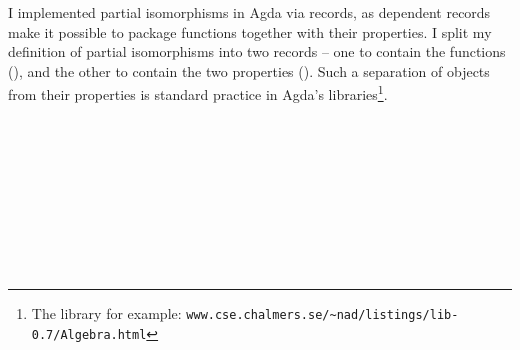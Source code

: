 \documentclass[12pt,a4paper,twoside,openright]{report}
\newcommand{\F}{\AgdaFunction}
\begin{document}
I implemented partial isomorphisms in Agda via records, as dependent records make it possible to package functions together with their properties. I split my definition of partial isomorphisms into two records -- one to contain the functions (\F{Iso}), and the other to contain the two properties (\F{IsIso}). Such a separation of objects from their properties is standard practice in Agda's libraries\footnote{The \F{Algebra} library for example: {\tt www.cse.chalmers.se/\~{}nad/listings/lib-0.7/Algebra.html}}.

\begin{code}
\>  \AgdaSymbol{\{}  \AgdaSymbol{:} \AgdaSymbol{\}} \AgdaSymbol{(} \AgdaSymbol{:}    \AgdaSymbol{)} \AgdaSymbol{(} \AgdaSymbol{:}    \AgdaSymbol{)} \AgdaSymbol{:}  \<%
\\
\>[0]\<[2]%
\>[2]\<%
\\
\>[2]\<[4]%
\>[4]\AgdaInductiveConstructor{\_,\_}\<%
\\
\>[0]\<[2]%
\>[2]\<%
\\
\>[2]\<[4]%
\>[4] \AgdaSymbol{:} \AgdaSymbol{(} \AgdaSymbol{:} \AgdaSymbol{)} \AgdaSymbol{(} \AgdaSymbol{:} \AgdaSymbol{)}            \<%
\\
\>[2]\<[4]%
\>[4] \AgdaSymbol{:} \AgdaSymbol{(} \AgdaSymbol{:} \AgdaSymbol{)} \AgdaSymbol{(} \AgdaSymbol{:} \AgdaSymbol{)}            \<%
\\
%
\\
\>  \AgdaSymbol{(}  \AgdaSymbol{:} \AgdaSymbol{)} \AgdaSymbol{:}  \<%
\\

\end{code}
\end{document}
